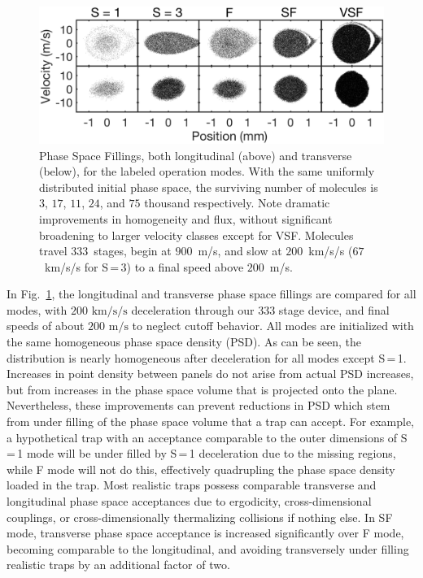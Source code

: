 \documentclass[%
 reprint,
 amsmath,amssymb,
 aps,
prl,
]{revtex4-1}
\begin{document}
\begin{figure}[t]
\includegraphics[width=\linewidth]{5x2-PSD-Compare.png}
\vspace{-15pt}
\caption{\label{fig:phasespace}
Phase Space Fillings, both longitudinal (above) and transverse (below), for the labeled operation modes. 
With the same uniformly distributed initial phase space, the surviving number of molecules is $3$, $17$, $11$, $24$, and $75$ thousand respectively.
Note dramatic improvements in homogeneity and flux, without significant broadening to larger velocity classes except for VSF. 
Molecules travel $333$~stages, begin at $900$~m/s, and slow at $200$~km/s/s ($67$~km/s/s for S\,=\,3) to a final speed above $200$~m/s.
\vspace{-15pt}}
\end{figure}

In Fig.~\ref{fig:phasespace}, the longitudinal and transverse phase space fillings are compared for all modes, with $200\text{ km/s/s}$ deceleration through our $333$ stage device, and final speeds of about $200\text{ m/s}$ to neglect cutoff behavior. 
All modes are initialized with the same homogeneous phase space density (PSD).
As can be seen, the distribution is nearly homogeneous after deceleration for all modes except S\,=\,1.
Increases in point density between panels do not arise from actual PSD increases, but from increases in the phase space volume that is projected onto the plane.
Nevertheless, these improvements can prevent reductions in PSD which stem from under filling of the phase space volume that a trap can accept.
For example, a hypothetical trap with an acceptance comparable to the outer dimensions of S\,=\,1 mode will be under filled by S\,=\,1 deceleration due to the missing regions, while F mode will not do this, effectively quadrupling the phase space density loaded in the trap.
Most realistic traps possess comparable transverse and longitudinal phase space acceptances due to ergodicity, cross-dimensional couplings, or cross-dimensionally thermalizing collisions if nothing else.
In SF mode, transverse phase space acceptance is increased significantly over F mode, becoming comparable to the longitudinal, and avoiding transversely under filling realistic traps by an additional factor of two.
\end{document}
